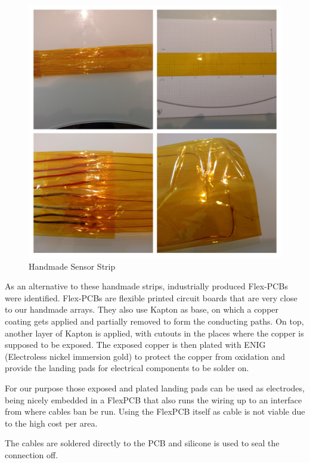 \begin{figure}
	\begin{center}
		\includegraphics[width=\textwidth]{images/v2.jpg} 
		\caption{Handmade Sensor Strip}
		\label{fig:v2}
	\end{center}
\end{figure}

As an alternative to these handmade strips, industrially produced Flex-PCBs were identified. Flex-PCBs are flexible printed circuit boards that are very close to our handmade arrays. They also use Kapton as base, on which a copper coating gets applied and partially removed to form the conducting paths. On top, another layer of Kapton is applied, with cutouts in the places where the copper is supposed to be exposed. The exposed copper is then plated with ENIG (Electroless nickel immersion gold) to protect the copper from oxidation and provide the landing pads for electrical components to be solder on.

For our purpose those exposed and plated landing pads can be used as electrodes, being nicely embedded in a FlexPCB that also runs the wiring up to an interface from where cables ban be run. Using the FlexPCB itself as cable is not viable due to the high cost per area.

The cables are soldered directly to the PCB and silicone is used to seal the connection off.

